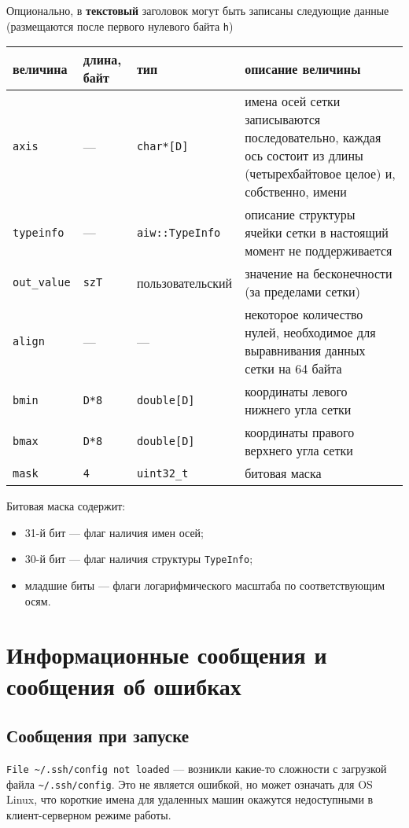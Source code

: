 \documentclass[12pt]{article}
\begin{document}
Опционально, в {\bf текстовый} заголовок могут быть записаны следующие данные (размещаются после первого нулевого байта {\tt h})
\begin{center}
\begin{tabular}{|p{}|p{}|p{}|p{}|}
\hline
величина & длина, байт & тип & описание величины \\
\hline
  {\tt axis} & --- & {\tt char*[D]} & имена осей сетки записываются последовательно, каждая ось состоит из длины (четырехбайтовое целое) и, собственно, имени\\
  {\tt typeinfo} & --- & {\tt aiw::TypeInfo} & описание структуры ячейки сетки в настоящий момент не поддерживается \\
  {\tt out\_value} & {\tt szT} & пользовательский & значение на бесконечности (за пределами сетки) \\
  {\tt align} & --- & --- & некоторое количество нулей, необходимое для выравнивания данных сетки на 64 байта \\
  {\tt bmin} & {\tt D*8} & {\tt double[D]} & координаты левого нижнего угла сетки \\
  {\tt bmax} & {\tt D*8} & {\tt double[D]} & координаты правого верхнего угла сетки \\
  {\tt mask} & {\tt 4} & {\tt uint32\_t} & битовая маска \\  
  \hline
\end{tabular}
\end{center}
Битовая маска содержит:
\begin{itemize}
  \item 31-й бит --- флаг наличия имен осей;
  \item 30-й бит --- флаг наличия структуры {\tt TypeInfo};
  \item младшие биты --- флаги логарифмического масштаба по соответствующим осям.
\end{itemize}
\section{Информационные сообщения и сообщения об ошибках}  
\subsection{Сообщения при запуске}
\verb'File ~/.ssh/config not loaded' --- возникли какие-то сложности с загрузкой файла \verb'~/.ssh/config'.
Это не является ошибкой, но может означать для OS Linux, что короткие имена для удаленных машин окажутся недоступными в клиент-серверном режиме работы.
\end{document}
